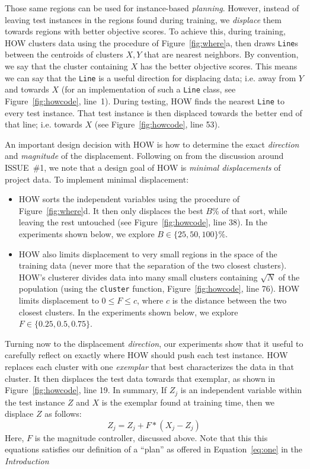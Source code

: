 \documentclass[conference]{IEEEtran}
\newcommand{\eq}[1]{Equation~\ref{eq:#1}}
\newcommand{\bi}{\begin{itemize}}
\newcommand{\ei}{\end{itemize}}
\newcommand{\fig}[1]{Figure~\ref{fig:#1}}
\begin{document}




Those same regions can be used for instance-based 
{\em planning}. However,  instead of leaving test instances in the regions
found during training, we {\em displace} them towards regions
with better objective scores.
To achieve this, 
during training, HOW clusters data using the procedure of \fig{where}a,
then draws {\tt Line}s between the centroids of  clusters $X,Y$ that are nearest
neighbors.
By convention, we say that the cluster containing $X$ has the  better objective scores. This means we can say that the {\tt Line} is a useful direction for displacing
data; i.e.  away from $Y$ and towards $X$ (for an implementation of such a {\tt Line} class, see \fig{howcode}, line~1).
 During testing,  HOW   finds the  nearest {\tt Line} to every test instance. That  test instance is   then displaced towards the better end
of that line; i.e. towards  $X$ (see \fig{howcode}, line 53).

An important design decision with HOW 
is how to determine the exact {\em direction} and {\em magnitude} of the
displacement.  Following on from the discussion around   ISSUE~\#1,
we note that a design goal of HOW is
{\em minimal displacements} of project data.
To implement minimal displacement:
\bi
\item
HOW sorts  the independent variables
using the procedure of  \fig{where}d. It then only
displaces the    best $B$\%  of that sort, while leaving the rest untouched
(see \fig{howcode}, line 38).
In  the experiments shown below,  we explore   $B \in \{25,50,100\}\%$.
\item
HOW also  limits displacement
to very small regions in the space of the training data (never more that the separation
of the two closest clusters).  HOW's clusterer divides  data into many   small clusters containing
$\sqrt{N}$ of the population (using the {\tt cluster} function, \fig{howcode}, line 76).
HOW   limits displacement to  \mbox{$0 \le F \le c$}, where
$c$ is the distance between the two closest clusters. 
In  the experiments shown below,  we explore
\mbox{$F\in \{0.25, 0.5, 0.75\}$}.
\ei
Turning now to the displacement {\em direction},
our experiments show that it useful to  carefully reflect on exactly where HOW should  push each test instance.
HOW replaces each cluster   with one {\em exemplar} that best
characterizes the data in that cluster. It then displaces the
test data towards that exemplar, as shown in \fig{howcode}, line 19. In summary, 
If  $Z_j$ is an independent variable within the
test instance $Z$ and  $X$ is the exemplar found at training time,
then we displace $Z$ as follows:
\[Z_j =  Z_j + F*(X_j - Z_j)\]
Here, $F$ is the  magnitude controller, discussed above. Note that this
this equations satisfies our definition of a ``plan'' as offered in
\eq{one} in the {\em Introduction}
\end{document}
